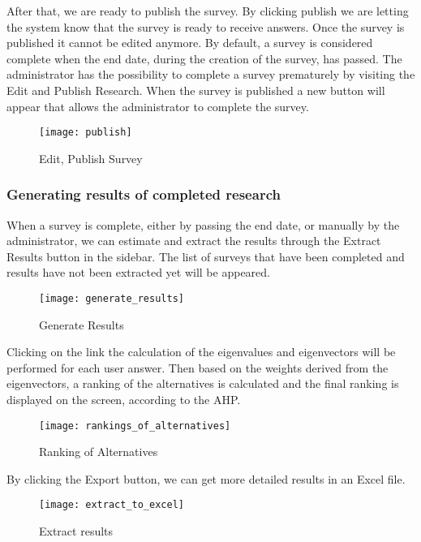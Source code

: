 \documentclass{article}
\begin{document}
After that, we are ready to publish the survey. By clicking publish we are letting the system know that the survey is ready to receive answers. Once the survey is published it cannot be edited anymore. By default, a survey is considered complete when the end date, during the creation of the survey, has passed. The administrator has the possibility to complete a survey prematurely by visiting the Edit and Publish Research. When the survey is published a new button will appear that allows the administrator to complete the survey.

\begin{figure}[h!]
\centering
\texttt{[image: publish]}
\caption{Edit, Publish Survey}
\label{fig:edit-publish}
\end{figure}



\subsubsection*{Generating results of completed research}

When a survey is complete, either by passing the end date, or manually by the administrator, we can estimate and extract the results through the Extract Results button in the sidebar. The list of surveys that have been completed and results have not been extracted yet will be appeared.


\begin{figure}[h!]
\centering
\texttt{[image: generate\_results]}
\caption{Generate Results}
\label{fig:generate results}
\end{figure}



Clicking on the link the calculation of the eigenvalues and eigenvectors will be performed for each user answer. Then based on the weights derived from the eigenvectors, a ranking of the alternatives is calculated and the final ranking is displayed on the screen, according to the AHP.

\begin{figure}[h!]
\centering
\texttt{[image: rankings\_of\_alternatives]}
\caption{Ranking of Alternatives}
\label{fig:ranking of alternatives}
\end{figure}


By clicking the Export button, we can get more detailed results in an Excel file.

\begin{figure}[h!]
\centering
\texttt{[image: extract\_to\_excel]}
\caption{Extract results}
\label{fig:extract-to-excel}
\end{figure}
\end{document}
